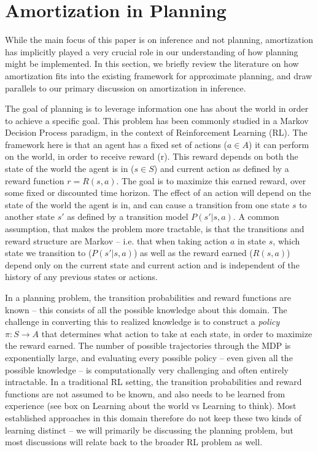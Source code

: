 \section{Amortization in Planning}

While the main focus of this paper is on inference and not planning, amortization has implicitly played a very crucial role in our understanding of how planning might be implemented. In this section, we briefly review the literature on how amortization fits into the existing framework for approximate planning, and draw parallels to our primary discussion on amortization in inference.

The goal of planning is to leverage information one has about the world in order to achieve a specific goal. This problem has been commonly studied in a Markov Decision Process paradigm, in the context of Reinforcement Learning (RL). The framework here is that an agent has a fixed set of actions ($a \in A$) it can perform on the world, in order to receive reward (r). This reward depends on both the state of the world the agent is in ($s \in S$) and current action as defined by a reward function $r = R(s, a)$. The goal is to maximize this earned reward, over some fixed or discounted time horizon. The effect of an action will depend on the state of the world the agent is in, and can cause a transition from one state $s$ to another state $s'$ as defined by a transition model $P(s' | s, a)$. A common assumption, that makes the problem more tractable, is that the transitions and reward structure are Markov -- i.e. that when taking action $a$ in state $s$, which state we transition to ($P(s' | s, a)$) as well as the reward earned ($R(s,a)$) depend only on the current state and current action and is independent of the history of any previous states or actions.

In a planning problem, the transition probabilities and reward functions are known -- this consists of all the possible knowledge about this domain. The challenge in converting this to realized knowledge is to construct a \textit{policy} $\pi: S \rightarrow A$ that determines what action to take at each state, in order to maximize the reward earned. The number of possible trajectories through the MDP is exponentially large, and evaluating every possible policy -- even given all the possible knowledge -- is computationally very challenging and often entirely intractable. In a traditional RL setting, the transition probabilities and reward functions are not assumed to be known, and also needs to be learned from experience (see box on Learning about the world vs Learning to think). Most established approaches in this domain therefore do not keep these two kinds of learning distinct -- we will primarily be discussing the planning problem, but most discussions will relate back to the broader RL problem as well.

